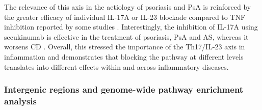 The relevance of this axis in the aetiology of psoriasis and PsA is reinforced by the greater efficacy of individual IL-17A or IL-23 blockade compared to TNF inhibition reported by some studies \parencite{Griffiths2015,Blauvelt2017}. Interestingly, the inhibition of IL-17A using secukinumab is effective in the treatment of psoriasis, PsA and AS, whereas it worsens CD \parencite{Patel2012,Hueber2012}.  Overall, this stressed the importance of the Th17/IL-23 axis in inflammation and demonstrates that blocking the pathway at different levels translates into different effects within and across inflammatory diseases.  


\subsubsection{Intergenic regions and genome-wide pathway enrichment analysis}

